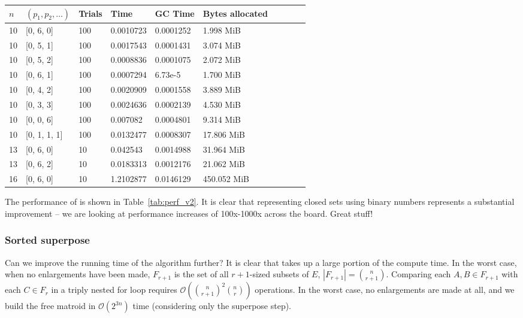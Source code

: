 \begin{table*}[ht!]
  \centering
  \caption{Performance of $\texttt{random\_kmc\_v2}$.}
  \label{tab:perf_v2}
  \begin{threeparttable}
    \begin{tabular}{llllllllll}
      \toprule
      $n$ & $(p_1, p_2, \ldots)$ & Trials & Time  & GC Time & Bytes allocated \\
      \midrule
      10 & [0, 6, 0] & 100 & 0.0010723 & 0.0001252 & 1.998 MiB \\ 
      10 & [0, 5, 1] & 100 & 0.0017543 & 0.0001431 & 3.074 MiB \\ 
      10 & [0, 5, 2] & 100 & 0.0008836 & 0.0001075 & 2.072 MiB \\ 
      10 & [0, 6, 1] & 100 & 0.0007294 & 6.73e-5 & 1.700 MiB \\ 
      10 & [0, 4, 2] & 100 & 0.0020909 & 0.0001558 & 3.889 MiB \\ 
      10 & [0, 3, 3] & 100 & 0.0024636 & 0.0002139 & 4.530 MiB \\ 
      10 & [0, 0, 6] & 100 & 0.007082 & 0.0004801 & 9.314 MiB \\ 
      10 & [0, 1, 1, 1] & 100 & 0.0132477 & 0.0008307 & 17.806 MiB \\ 
      13 & [0, 6, 0] & 10 & 0.042543 & 0.0014988 & 31.964 MiB \\ 
      13 & [0, 6, 2] & 10 & 0.0183313 & 0.0012176 & 21.062 MiB \\ 
      16 & [0, 6, 0] & 10 & 1.2102877 & 0.0146129 & 450.052 MiB \\ 
      \bottomrule
    \end{tabular}
  \end{threeparttable}
\end{table*}

The performance of  is shown in Table~\ref{tab:perf_v2}. It is clear that representing closed sets using binary numbers represents a substantial improvement -- we are looking at performance increases of 100x-1000x across the board. Great stuff!


\subsubsection{Sorted superpose}
Can we improve the running time of the algorithm further? It is clear that  takes up a large portion of the compute time. In the worst case, when no enlargements have been made, $F_{r+1}$ is the set of all $r+1$-sized subsets of $E$, $|F_{r+1}| = {\binom{n}{r+1}}$. Comparing each $A,B \in F_{r+1}$ with each $C \in F_r$ in a triply nested for loop requires $\mathcal{O}({\binom{n}{r+1}}^2{\binom{n}{r}})$ operations. In the worst case, no enlargements are made at all, and we build the free matroid in $\mathcal{O}(2^{3n})$ time (considering only the superpose step).

